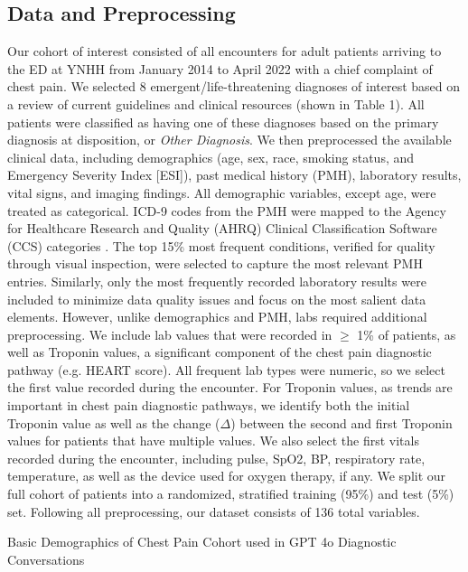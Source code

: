 \subsection{Data and Preprocessing}

Our cohort of interest consisted of all encounters for adult patients arriving to the ED at YNHH from January 2014 to April 2022 with a chief complaint of chest pain. We selected 8 emergent/life-threatening diagnoses of interest based on a review of current guidelines and clinical resources (shown in Table 1). All patients were classified as having one of these diagnoses based on the primary diagnosis at disposition, or \emph{Other Diagnosis}. We then preprocessed the available clinical data, including demographics (age, sex, race, smoking status, and Emergency Severity Index [ESI]), past medical history (PMH), laboratory results, vital signs, and imaging findings. All demographic variables, except age, were treated as categorical. ICD-9 codes from the PMH were mapped to the Agency for Healthcare Research and Quality (AHRQ) Clinical Classification Software (CCS) categories \citep{hcup2021ccsr}. The top 15\% most frequent conditions, verified for quality through visual inspection, were selected to capture the most relevant PMH entries. Similarly, only the most frequently recorded laboratory results were included to minimize data quality issues and focus on the most salient data elements. However, unlike demographics and PMH, labs required additional preprocessing. We include lab values that were recorded in $\geq$ 1\% of patients, as well as Troponin values, a significant component of the chest pain diagnostic pathway (e.g. HEART score). All frequent lab types were numeric, so we select the first value recorded during the encounter. For Troponin values, as trends are important in chest pain diagnostic pathways\citep{appleIFCCEducationalMaterials2015}, we identify both the initial Troponin value as well as the change ($\Delta$) between the second and first Troponin values for patients that have multiple values. We also select the first vitals recorded during the encounter, including pulse, SpO2, BP, respiratory rate, temperature, as well as the device used for oxygen therapy, if any. We split our full cohort of patients into a randomized, stratified training (95\%) and test (5\%) set.  Following all preprocessing, our dataset consists of 136 total variables. 

\begin{table}
\centering
\caption{Basic Demographics of Chest Pain Cohort used in GPT 4o Diagnostic Conversations}
\resizebox{0.85\textwidth}{!}{%

\label{tab:aim3-table1}
}
\end{table}

